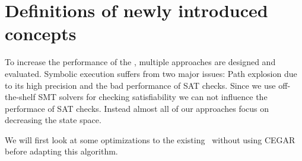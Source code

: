 \section{Definitions of newly introduced concepts}

To increase the performance of the \symbolicExecutionCPA, multiple approaches are designed and evaluated.
Symbolic execution suffers from two major issues:
Path explosion due to its high precision and the bad performance of SAT checks.
Since we use off-the-shelf SMT solvers for checking satisfiability we can not influence the performace of SAT checks.
Instead almost all of our approaches focus on decreasing the state space.

We will first look at some optimizations to the existing \symbolicExecutionCPA\ without using CEGAR before adapting this algorithm.





